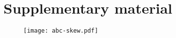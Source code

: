 \chapter{Supplementary material}

\begin{figure}
	\centering
	\texttt{[image: abc-skew.pdf]}
\end{figure}